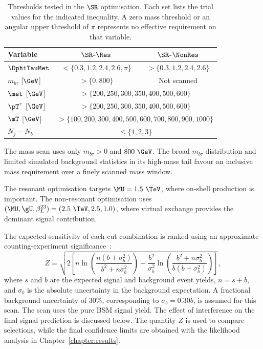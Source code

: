 \begin{table}[htbp]
    \centering
    \small
    \caption{Thresholds tested in the $\SR$ optimisation. Each set lists the trial values for the indicated inequality. A zero mass threshold or an angular upper threshold of $\pi$ represents no effective requirement on that variable.}
    \label{tab:ch7_scan_variables}
    \begin{tabular}{lcc}
        \toprule
        Variable & $\SR$-$\Res$ & $\SR$-$\NonRes$ \\
        \midrule
        $\DphiTauMet$ & $<\{0.3,1.2,2.4,2.6,\pi\}$ & $>\{0.3,1.2,2.4,2.6\}$ \\
        $m_{b\tau}$ [$\GeV$] & $>\{0,800\}$ & Not scanned \\
        $\met$ [$\GeV$] & \multicolumn{2}{c}{$>\{200,250,300,350,400,500,600\}$} \\
        $\pT^\tau$ [$\GeV$] & \multicolumn{2}{c}{$>\{200,250,300,350,400,500,600\}$} \\
        $\mT$ [$\GeV$] & \multicolumn{2}{c}{$>\{100,200,300,400,500,600,700,800,900,1000\}$} \\
        $N_j-N_b$ & \multicolumn{2}{c}{$\leq\{1,2,3\}$} \\
        \bottomrule
    \end{tabular}
\end{table}

The mass scan uses only $m_{b\tau}>0$ and $800~\GeV$.
The broad $m_{b\tau}$ distribution and limited simulated background statistics in its high-mass tail favour an inclusive mass requirement over a finely scanned mass window.

The resonant optimisation targets $\MU=1.5~\TeV$, where on-shell production is important.
The non-resonant optimisation uses $(\MU,\gU,\beta_L^{23})=(2.5~\TeV,2.5,1.0)$, where virtual exchange provides the dominant signal contribution.

The expected sensitivity of each cut combination is ranked using an approximate counting-experiment significance~\cite{ATL-PHYS-PUB-2020-025}:
\begin{equation}
    Z = \sqrt{2\left[n\ln\!\left(\frac{n(b+\sigma_b^2)}{b^2+n\sigma_b^2}\right)-\frac{b^2}{\sigma_b^2}\ln\!\left(\frac{b^2+n\sigma_b^2}{b(b+\sigma_b^2)}\right)\right]},
    \label{eq:ch7_optimisation_significance}
\end{equation}
where $s$ and $b$ are the expected signal and background event yields, $n=s+b$, and $\sigma_b$ is the absolute uncertainty in the background expectation.
A fractional background uncertainty of $30\%$, corresponding to $\sigma_b=0.30b$, is assumed for this scan.
The scan uses the pure BSM signal yield.
The effect of interference on the final signal prediction is discussed below.
The quantity $Z$ is used to compare selections, while the final confidence limits are obtained with the likelihood analysis in Chapter~\ref{chapter:results}.

